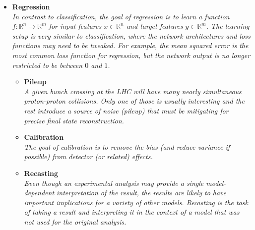 \documentclass[12pt,letterpaper]{article}
\begin{document}
\begin{itemize}
\begin{itemize}
\begin{itemize}
			\end{itemize}
	\end{itemize}
\item \textbf{Regression}
\\\textit{In contrast to classification, the goal of regression is to learn a function $f:\mathbb{R}^n\rightarrow\mathbb{R}^m$ for input features $x\in\mathbb{R}^n$ and target features $y\in\mathbb{R}^m$.  The learning setup is very similar to classification, where the network architectures and loss functions may need to be tweaked.  For example, the mean squared error is the most common loss function for regression, but the network output is no longer restricted to be between $0$ and $1$.}
	\begin{itemize}
		\item \textbf{Pileup}~\cite{Komiske:2017ubm,ATL-PHYS-PUB-2019-028,Martinez:2018fwc,Carrazza:2019efs,Maier:2021ymx,Li:2022omf,CRESST:2022qor,Kim:2023koz}
		\\\textit{A given bunch crossing at the LHC will have many nearly simultaneous proton-proton collisions.  Only one of those is usually interesting and the rest introduce a source of noise (pileup) that must be mitigating for precise final state reconstruction.}
		\item \textbf{Calibration}~\cite{Cheong:2019upg,ATL-PHYS-PUB-2020-001,ATL-PHYS-PUB-2018-013,Hooberman:DLPS2017,Kasieczka:2020vlh,Sirunyan:2019wwa,Baldi:2020hjm,Du:2020pmp,Kieseler:2021jxc,Pollard:2021fqv,Akchurin:2021afn,Kieseler:2020wcq,Akchurin:2021ahx,Diefenthaler:2021rdj,Polson:2021kvr,Micallef:2021src,Arratia:2021tsq,Kronheim:2021hdb,Renteria-Estrada:2021zrd,Pata:2022wam,Chadeeva:2022kay,Dorigo:2022tfi,Alves:2022gnw,Qiu:2022xvr,Akchurin:2022apq,Gambhir:2022gua,Gambhir:2022dut,Valsecchi:2022rla,Leigh:2022lpn,Darulis:2022brn,Ge:2022xrv,Guglielmi:2022ftj,Aad:2023ula,Lee:2023jew,Schwenker:2023bih,Basak:2023wzq,Grosso:2023jxp,Grosso:2023ltd,Soleymaninia:2023dds,Raine:2023fko,Khozani:2023bql,ATLAS:2023tyv,ALICETPC:2023ojd,Meyer:2023ffd,Holmberg:2023rfr,Bein:2023ylt,Acosta:2023nuw}
		\\\textit{The goal of calibration is to remove the bias (and reduce variance if possible) from detector (or related) effects.}
		\item \textbf{Recasting}~\cite{Caron:2017hku,Bertone:2016mdy,1806026,Hammad:2022wpq}
		\\\textit{Even though an experimental analysis may provide a single model-dependent interpretation of the result, the results are likely to have important implications for a variety of other models.  Recasting is the task of taking a result and interpreting it in the context of a model that was not used for the original analysis.}

\end{itemize}
\end{itemize}
\end{document}
